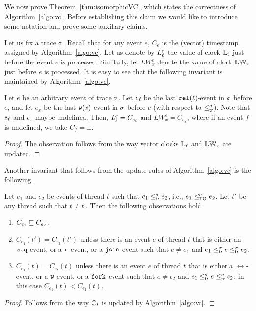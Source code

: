 

We now prove Theorem~\ref{thm:isomorphicVC}, which states the
correctness of Algorithm~\ref{algo:vc}. Before establishing this claim
we would like to introduce some notation and prove some auxiliary
claims. 

Let us fix a trace $\sigma$. Recall that for any event $e$, $C_e$ is the
(vector) timestamp assigned by Algorithm~\ref{algo:vc}. Let us denote
by $L_\ell^e$ the value of clock $\mathbb{L}_\ell$ just before the event $e$ is
processed. Similarly, let $LW_x^e$ denote the value of clock $\mathbb{LW}_x$
just before $e$ is processed. It is easy to see that the following
invariant is maintained by Algorithm~\ref{algo:vc}.
%
\begin{proposition}
\label{prop:vc-invariant1}
Let $e$ be an arbitrary event of trace $\sigma$. Let $e_\ell$ be the last
$\mathtt{rel}(\ell)$-event in $\sigma$ before $e$, and let $e_x$ be the last
$\mathtt{w}(x)$-event in $\sigma$ before $e$ (with respect to
$\leq^{\sigma}_{\mathsf{tr}}$). Note that $e_\ell$ and $e_x$ maybe undefined. Then,
$L_\ell^e = C_{e_\ell}$ and $LW_x^e = C_{e_x}$, where if an event $f$ is
undefined, we take $C_f = \bot$.
\end{proposition}
%
\begin{proof}
The observation follows from the way vector clocks $\mathbb{L}_\ell$ and
$\mathbb{LW}_x$ are updated.
\end{proof}

Another invariant that follows from the update rules of
Algorithm~\ref{algo:vc} is the following.
%
\begin{proposition}
\label{prop:vc-invariant2}
Let $e_1$ and $e_2$ be events of thread $t$ such that $e_1 \leq^{\sigma}_{\mathsf{tr}}
e_2$, i.e., $e_1 \leq^{\sigma}_{\mathsf{TO}} e_2$. Let $t'$ be any thread such that
$t \neq t'$. Then the following observations hold.
\begin{enumerate}
\item\label{lbl:monotonic} $C_{e_1} \sqsubseteq C_{e_2}$.
\item\label{lbl:remote-clk-upd} $C_{e_1}(t') = C_{e_2}(t')$ unless
  there is an event $e$ of thread $t$ that is either an $\mathtt{acq}$-event, or
  a $\mathtt{r}$-event, or a $\mathtt{join}$-event such that $e \neq e_1$ and
  $e_1 \leq^{\sigma}_{\mathsf{tr}} e \leq^{\sigma}_{\mathsf{tr}} e_2$.
\item\label{lbl:local-clk-upd} $C_{e_1}(t) = C_{e_2}(t)$ unless there
  is an event $e$ of thread $t$ that is either a $\rel$-event, or a
  $\mathtt{w}$-event, or a $\mathtt{fork}$-event such that $e \neq e_2$ and
  $e_1 \leq^{\sigma}_{\mathsf{tr}} e \leq^{\sigma}_{\mathsf{tr}} e_2$; in this case $C_{e_1}(t) <
  C_{e_2}(t)$.
\end{enumerate}
\end{proposition}
%
\begin{proof}
Follows from the way $\mathbb{C}_t$ is updated by Algorithm~\ref{algo:vc}.
\end{proof}

